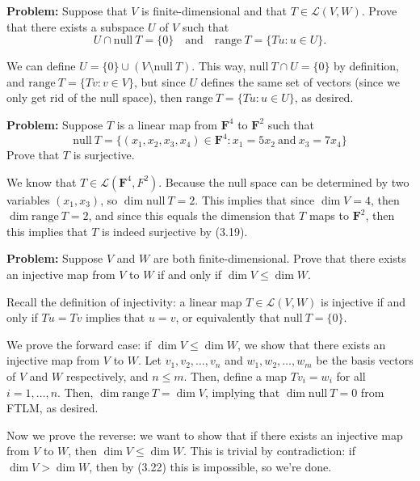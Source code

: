 \documentclass[10pt]{article}
\newcommand{\F}{\mathbf F}
\newcommand{\range}{\mathrm{range \ }}
\renewcommand{\null}{\mathrm{null \ }}
\newenvironment{problem}{\textbf{Problem:}}{}
\begin{document}
	\begin{problem}
		Suppose that \( V \) is finite-dimensional and that \( T \in \mathcal L(V, W). \) Prove that there 
		exists a subspace \( U \) of \( V \) such that 
		\[
		U \cap \null T = \{0\}  \quad \text{and} \quad \range T = \{Tu :u \in U\}.
		\] 
	\end{problem}

	\begin{solution}
		We can define \( U = \{0\} \cup (V \setminus \null T) \). This way, \( \null T \cap U = \{0\}  \) by 
		definition, and \( \range T = \{Tv: v\in V\}  \), but since \( U \) defines the same set of vectors 
		(since we only get rid of the null space), then \( \range T = \{Tu: u \in U\}  \), as desired. 
	\end{solution}

	\begin{problem}
		Suppose \( T \) is a linear map from \( \F^{4} \) to \( \F^{2} \) such that 
		\[
		\null T = \{(x_1, x_2, x_3, x_4) \in \F^{4}: x_1 = 5x_2 \ \text{and} \ x_3 = 7x_4\} 
		\] 
		Prove that \( T \) is surjective.
	\end{problem}

	\begin{solution}
		We know that \( T \in \mathcal L(\F^{4}, F^{2}) \). Because the null space can be determined by two variables
		\( (x_1, x_3) \), so \( \dim \null T = 2 \). This implies that since  \( \dim V = 4 \), then 
		\( \dim \range T = 2 \), and since this equals the dimension that \( T \) maps to \( \F^2 \), then 
		this implies that \( T  \) is indeed surjective by (3.19).
	\end{solution}

	\begin{problem}
		Suppose \( V \) and \( W \) are both finite-dimensional. Prove that there exists an injective map 
		from \( V \) to \( W \) if and only if \( \dim V \le \dim W \). 
	\end{problem}

	\begin{solution}
		Recall the definition of injectivity: a linear map \( T \in \mathcal L(V, W)  \) is injective if and only if 
		\( Tu = Tv \) implies that \( u = v \), or equivalently that \( \null T = \{ 0 \}  \). 

		We prove the forward case: if \( \dim V \le \dim W \), we show that there exists 
		an injective map from \( V \) to \( W \). Let \( v_1, v_2, \dots, v_n \) and \( w_1, w_2, \dots, w_m \) 
		be the basis vectors of \( V \) and \( W \) respectively, and \( n \le m \). Then, define a map
		\( Tv_i = w_i \) for all \( i = 1, \dots, n \). Then, \( \dim \range T = \dim V \), implying 
		that \( \dim \null T = 0 \) from FTLM, as desired. 

		Now we prove the reverse: we want to show that if there exists an 
		injective map from \( V \) to \( W \), then \( \dim V \le \dim W \). This is trivial by contradiction:
		if \( \dim V > \dim W \), then by (3.22) this is impossible, so we're done.   
	\end{solution}
\end{document}
